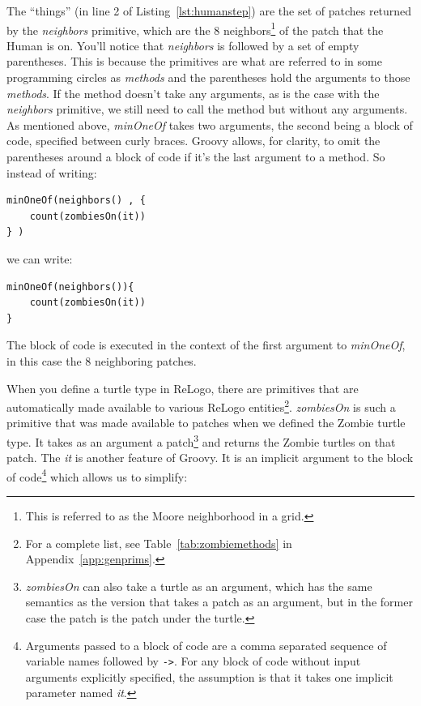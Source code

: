 \documentclass[11pt]{amsart}
\begin{document}
The ``things'' (in line 2 of Listing~\ref{lst:humanstep}) are the set of patches returned by the \emph{neighbors} primitive, which are the 8 neighbors\footnote{This is referred to as the Moore neighborhood in a grid.} of the patch that the Human is on. You'll notice that \emph{neighbors} is followed by a set of empty parentheses. This is because the primitives are what are referred to in some programming circles as \emph{methods} and the parentheses hold the arguments to those \emph{methods}. If the method doesn't take any arguments, as is the case with the \emph{neighbors} primitive, we still need to call the method but without any arguments. As mentioned above, \emph{minOneOf} takes two arguments, the second being a block of code, specified between curly braces. Groovy allows, for clarity, to omit the parentheses around a block of code if it's the last argument to a method. So instead of writing:

\noindent\begin{minipage}[h]{\textwidth}
\vspace{.2in}
\lstset{language=java, numbers=none}
\begin{lstlisting}
minOneOf(neighbors() , {
	count(zombiesOn(it))
} )
\end{lstlisting}
\vspace{.2in}
we can write:
\vspace{.2in}
\lstset{language=java}
\begin{lstlisting}
minOneOf(neighbors()){
	count(zombiesOn(it))
} 
\end{lstlisting}
\vspace{.2in}
\end{minipage}
The block of code is executed in the context of the first argument to \emph{minOneOf}, in this case the 8 neighboring patches.

When you define a turtle type in ReLogo, there are primitives that are automatically made available to various ReLogo entities\footnote{For a complete list, see Table~\ref{tab:zombiemethods} in Appendix~\ref{app:genprims}.}. \emph{zombiesOn} is such a primitive that was made available to patches when we defined the Zombie turtle type. It takes as an argument a patch\footnote{\emph{zombiesOn} can also take a turtle as an argument, which has the same semantics as the version that takes a patch as an argument, but in the former case the patch is the patch under the turtle.} and returns the Zombie turtles on that patch. The \emph{it} is another feature of Groovy. It is an implicit argument to the block of code\footnote{Arguments passed to a block of code are a comma separated sequence of variable names followed by \texttt{->}. For any block of code without input arguments explicitly specified, the assumption is that it takes one implicit parameter named \emph{it}.} which allows us to simplify:
\end{document}
